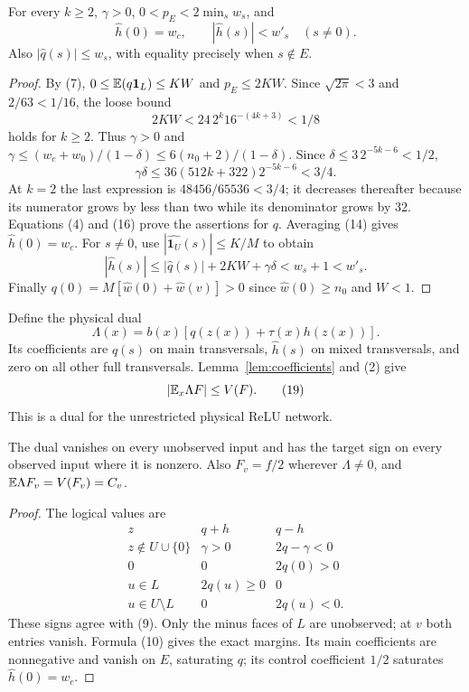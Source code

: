 \documentclass[11pt]{article}
\newcommand{\one}{\mathbf1}\newcommand{\relu}{\operatorname{ReLU}}
\begin{document}
\begin{lemma}\label{lem:coefficients}
For every $k\ge2$, $\gamma>0$, $0<p_E<2\min_s w_s$, and
\[
 \widehat h(0)=w_c,\qquad |\widehat h(s)|<w'_s\quad(s\ne0). \tag{15}
\]
Also $|\widehat q(s)|\le w_s$, with equality precisely when $s\notin E$.
\end{lemma}
\begin{proof}
By (7), $0\le\E(q\one_L)\le KW$ and $p_E\le2KW$.
Since $\sqrt{2\pi}<3$ and $2/63<1/16$, the loose bound
\[
                     2KW<24\,2^k16^{-(4k+3)}<1/8        \tag{16}
\]
holds for $k\ge2$. Thus $\gamma>0$ and
$\gamma\le(w_c+w_0)/(1-\delta)\le6(n_0+2)/(1-\delta)$.
Since $\delta\le3\,2^{-5k-6}<1/2$,
\[
             \gamma\delta\le36(512k+322)2^{-5k-6}<3/4.  \tag{17}
\]
At $k=2$ the last expression is $48456/65536<3/4$; it decreases
thereafter because its numerator grows by less than two while its
denominator grows by 32. Equations (4) and (16) prove the assertions
for $q$. Averaging (14) gives $\widehat h(0)=w_c$.
For $s\ne0$, use $|\widehat{\one_U}(s)|\le K/M$ to obtain
\[
 |\widehat h(s)|\le|\widehat q(s)|+2KW+\gamma\delta
                                      <w_s+1<w'_s.
\]
Finally $q(0)=M[\widehat w(0)+\widehat w(v)]>0$ since
$\widehat w(0)\ge n_0$ and $W<1$.
\end{proof}

Define the physical dual
\[
                    \Lambda(x)=b(x)[q(z(x))+\tau(x)h(z(x))]. \tag{18}
\]
Its coefficients are $\widehat q(s)$ on main transversals,
$\widehat h(s)$ on mixed transversals, and zero on all other full
transversals. Lemma~\ref{lem:coefficients} and (2) give
\[
                            |\mathbb E_x\Lambda F|\le V(F).     \tag{19}
\]
This is a dual for the unrestricted physical ReLU network.

\begin{lemma}\label{lem:signs}
The dual vanishes on every unobserved input and has the target sign on
every observed input where it is nonzero. Also $F_v=f/2$ wherever
$\Lambda\ne0$, and $\mathbb E\Lambda F_v=V(F_v)=C_v$.
\end{lemma}
\begin{proof}
The logical values are
\[
\begin{array}{c|cc}
 z&q+h&q-h\\\hline
 z\notin U\cup\{0\}&\gamma>0&2q-\gamma<0\\
 0&0&2q(0)>0\\
 u\in L&2q(u)\ge0&0\\
 u\in U\setminus L&0&2q(u)<0 .
\end{array}                                                   \tag{20}
\]
These signs agree with (9). Only the minus faces of $L$ are unobserved;
at $v$ both entries vanish. Formula (10) gives the exact margins.
Its main coefficients are nonnegative and vanish on $E$, saturating
$q$; its control coefficient $1/2$ saturates $\widehat h(0)=w_c$.
\end{proof}
\end{document}
